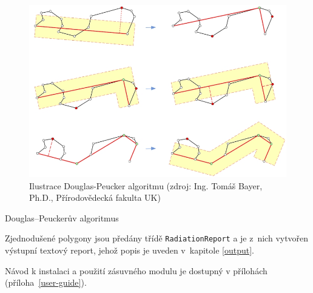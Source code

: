 \begin{figure}[H]
    \centering
      \includegraphics[width=350pt]{./pictures/DPalgoritmus.jpg}
      \caption[Ilustrace DP]{Ilustrace Douglas-Peucker algoritmu (zdroj: Ing. Tomáš Bayer, Ph.D., Přírodovědecká fakulta UK)}
      \label{fig:DPalgo}
\end{figure}	

\begin{algorithm}
\caption{Douglas–Peuckerův algoritmus}
\label{alg:RDP}
    \begin{algorithmic}[1] 
		\ENDIF	
	\ENDFOR
	\end{algorithmic}
\end{algorithm}	

\begin{algorithm}
    \begin{algorithmic}[1] 
	\ELSE
	\ENDIF
    \end{algorithmic}
\end{algorithm}	

\newpage

Zjednodušené polygony jsou předány třídě \texttt{RadiationReport} a 
je z~nich vytvořen výstupní textový report, jehož popis je uveden 
v~kapitole \ref{output}.

Návod k instalaci a použití zásuvného modulu je dostupný v přílohách (příloha~\ref{user-guide}).